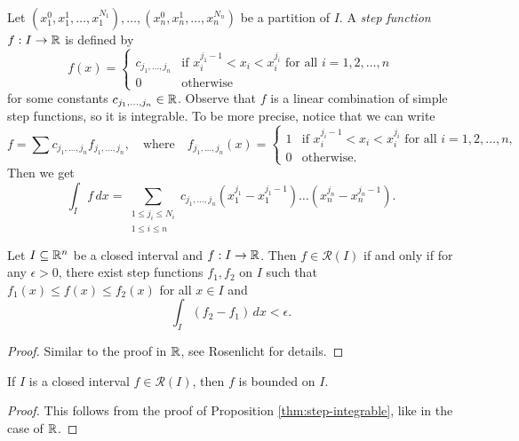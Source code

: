 \begin{example}
  Let $(x_1^0, x_1^1, \dots, x_1^{N_1}), \dots, (x_n^0, x_n^1, \dots, x_n^{N_n})$
  be a partition of $I$. A \emph{step function}
  $f : I \to \mathbb{R}$ is defined by
  \[
    f(x) =
    \begin{cases}
      c_{j_1, \dots, j_n} & \text{if } x_i^{j_1 - 1} < x_i < x_i^{j_i} \text{ for all } i = 1, 2, \dots, n \\
      0 & \text{otherwise}
    \end{cases}
  \]
  for some constants $c_{j_1, \dots, j_n} \in \mathbb{R}$.
  Observe that $f$ is a linear combination of simple step functions,
  so it is integrable. To be more precise, notice that
  we can write
  \[
    f = \sum c_{j_1, \dots, j_n} f_{j_1, \dots, j_n},
    \quad \text{where} \quad
    f_{j_1, \dots, j_n}(x) =
    \begin{cases}
      1 & \text{if } x_i^{j_i - 1} < x_i < x_i^{j_i} \text{ for all } i = 1, 2, \dots, n, \\
      0 & \text{otherwise}.
    \end{cases}
  \]
  Then we get
  \[
    \int_{I} f\, dx
    = \sum_{\substack{1 \le j_i \le N_i \\ 1 \le i \le n}} c_{j_1, \dots, j_n} (x_1^{j_1} - x_1^{j_1 - 1}) \dots (x_n^{j_n} - x_n^{j_n - 1}).
  \]
\end{example}

\begin{prop}
  \label{thm:step-integrable}
  Let $I \subseteq \mathbb{R}^n$ be a closed interval and
  $f : I \to \mathbb{R}$. Then
  $f \in \mathcal{R}(I)$ if and only if for any
  $\epsilon > 0$, there exist step functions
  $f_1, f_2$ on $I$ such that
  $f_1(x) \le f(x) \le f_2(x)$ for all $x \in I$
  and
  \[
    \int_{I} (f_2 - f_1)\, dx < \epsilon.
  \]
\end{prop}

\begin{proof}
  Similar to the proof in $\mathbb{R}$, see Rosenlicht for details.
\end{proof}

\begin{corollary}
  If $I$ is a closed interval $f \in \mathcal{R}(I)$,
  then $f$ is bounded on $I$.
\end{corollary}

\begin{proof}
  This follows from the proof of Proposition
  \ref{thm:step-integrable}, like in the case of $\mathbb{R}$.
\end{proof}

